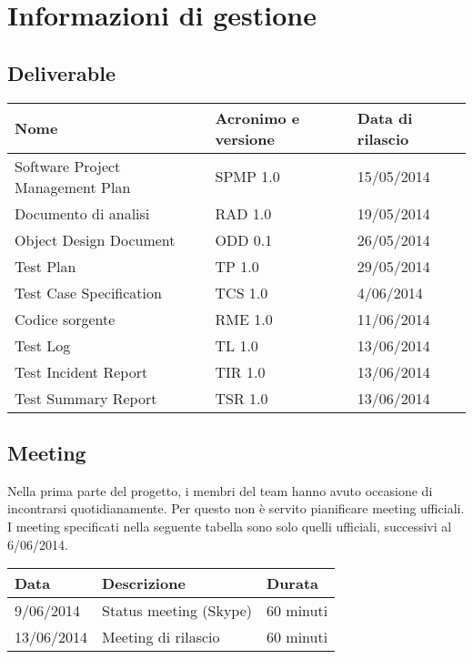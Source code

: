 \chapter{Informazioni di gestione}
\section{Deliverable}

\begin{table}[ht]
  \centering
  \begin{tabular}{|p{5cm}|p{3cm}|p{4cm}|}
    \hline
    \rowcolor{Gray}\textbf{Nome}	& \textbf{Acronimo e versione}			& \textbf{Data di rilascio}\\
    \hline
    Software Project Management Plan	& SPMP 1.0					& 15/05/2014		   \\
    \hline
    Documento di analisi		& RAD 1.0					& 19/05/2014		   \\
    \hline
    Object Design Document		& ODD 0.1					& 26/05/2014		   \\
    \hline
    Test Plan				& TP 1.0					& 29/05/2014		   \\
    \hline
    Test Case Specification		& TCS 1.0					& 4/06/2014		   \\
    \hline
    Codice sorgente			& RME 1.0					& 11/06/2014		   \\
    \hline
    Test Log				& TL 1.0					& 13/06/2014		   \\
    \hline
    Test Incident Report		& TIR 1.0					& 13/06/2014		   \\
    \hline
    Test Summary Report			& TSR 1.0					& 13/06/2014		   \\
    \hline
  \end{tabular}
\end{table}

\section{Meeting}
Nella prima parte del progetto, i membri del team hanno avuto occasione di incontrarsi quotidianamente. Per questo non è servito pianificare meeting ufficiali. I meeting specificati nella seguente tabella sono solo quelli ufficiali, successivi al 6/06/2014.

\begin{table}[ht]
  \centering
  \begin{tabular}{|p{3cm}|p{5cm}|p{3cm}|}
  \hline
  \rowcolor{Gray}\textbf{Data}		& \textbf{Descrizione}			& \textbf{Durata}			\\
  \hline
  9/06/2014				& Status meeting (Skype)		& 60 minuti				\\
  \hline
  13/06/2014				& Meeting di rilascio			& 60 minuti				\\
  \hline
  \end{tabular}
\end{table}
